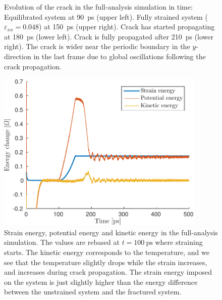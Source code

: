 \begin{figure}
\begin{minipage}[b]{0.5\linewidth}
\end{minipage}
\caption{Evolution of the crack in the full-analysis simulation in time: Equilibrated system at \SI{90}{\pico\second} (upper left). Fully strained system ($\varepsilon_{xx} = 0.048$) at \SI{150}{\pico\second} (upper right). Crack has started propagating at \SI{180}{\pico\second}  (lower left). Crack is fully propagated after \SI{210}{\pico\second}  (lower right). The crack is wider near the periodic boundary in the $y$-direction in the last frame due to global oscillations following the crack propagation.}
\label{fig:crack_evolution}
\end{figure}


\begin{figure}
\centering
\includegraphics[width=10cm]{../figures/thesis/strain_pot_kin_eng_1048_24_24_12.pdf}
\caption{Strain energy, potential energy and kinetic energy in the full-analysis simulation. The values are rebased at $t=\SI{100}{\pico\second}$ where straining starts. The kinetic energy corresponds to the temperature, and we see that the temperature slightly drops while the strain increases, and increases during crack propagation. The strain energy imposed on the system is just slightly higher than the energy difference between the unstrained system and the fractured system.}
\label{fig:energy_1048}
\end{figure}


